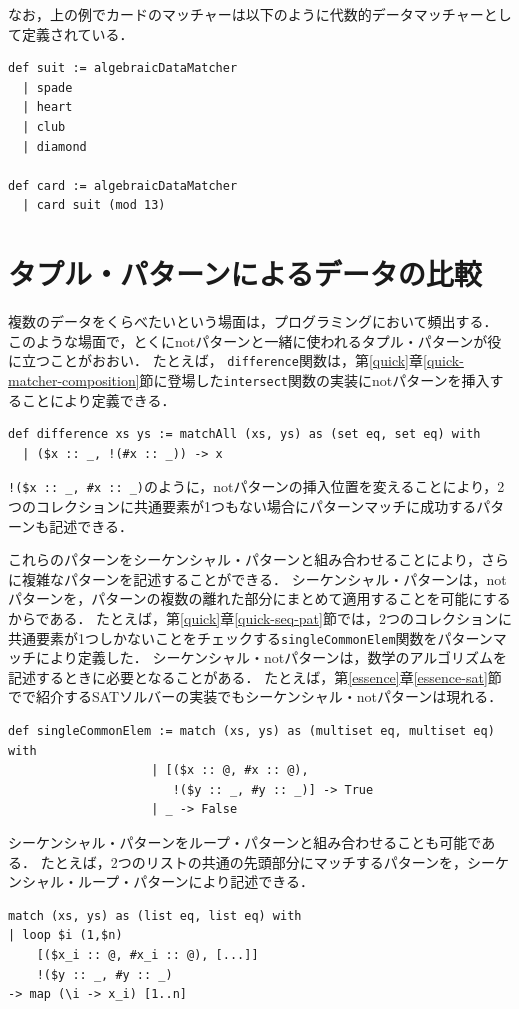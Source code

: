 なお，上の例でカードのマッチャーは以下のように代数的データマッチャーとして定義されている．
\begin{lstlisting}[language=egison,numbers=none]
def suit := algebraicDataMatcher
  | spade
  | heart
  | club
  | diamond

def card := algebraicDataMatcher
  | card suit (mod 13)
\end{lstlisting}

\section{タプル・パターンによるデータの比較}\label{pmo-tuple}

複数のデータをくらべたいという場面は，プログラミングにおいて頻出する．
このような場面で，とくにnotパターンと一緒に使われるタプル・パターンが役に立つことがおおい．
たとえば， \lstinline{difference}関数は，第\ref{quick}章\ref{quick-matcher-composition}節に登場した\lstinline{intersect}関数の実装にnotパターンを挿入することにより定義できる．
\begin{lstlisting}[language=egison,numbers=none]
def difference xs ys := matchAll (xs, ys) as (set eq, set eq) with
  | ($x :: _, !(#x :: _)) -> x
\end{lstlisting}
\lstinline|!($x :: _, #x :: _)|のように，notパターンの挿入位置を変えることにより，2つのコレクションに共通要素が1つもない場合にパターンマッチに成功するパターンも記述できる．

これらのパターンをシーケンシャル・パターンと組み合わせることにより，さらに複雑なパターンを記述することができる．
シーケンシャル・パターンは，notパターンを，パターンの複数の離れた部分にまとめて適用することを可能にするからである．
たとえば，第\ref{quick}章\ref{quick-seq-pat}節では，2つのコレクションに共通要素が1つしかないことをチェックする\lstinline{singleCommonElem}関数をパターンマッチにより定義した．
シーケンシャル・notパターンは，数学のアルゴリズムを記述するときに必要となることがある．
たとえば，第\ref{essence}章\ref{essence-sat}節でで紹介するSATソルバーの実装でもシーケンシャル・notパターンは現れる．
\begin{lstlisting}[language=egison,numbers=none]
def singleCommonElem := match (xs, ys) as (multiset eq, multiset eq) with
                    | [($x :: @, #x :: @),
                       !($y :: _, #y :: _)] -> True
                    | _ -> False
\end{lstlisting}

シーケンシャル・パターンをループ・パターンと組み合わせることも可能である．
たとえば，2つのリストの共通の先頭部分にマッチするパターンを，シーケンシャル・ループ・パターンにより記述できる．
\begin{lstlisting}[language=egison,numbers=none]
match (xs, ys) as (list eq, list eq) with
| loop $i (1,$n)
    [($x_i :: @, #x_i :: @), [...]]
    !($y :: _, #y :: _)
-> map (\i -> x_i) [1..n]
\end{lstlisting}

